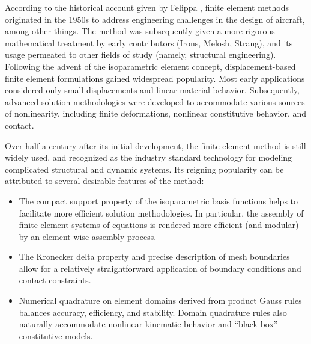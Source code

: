 	According to the historical account given by Felippa \cite{Felippa:04}, finite element methods originated in the 1950s to address engineering challenges in the design of aircraft, among other things. The method was subsequently given a more rigorous mathematical treatment by early contributors (Irons, Melosh, Strang), and its usage permeated to other fields of study (namely, structural engineering). Following the advent of the isoparametric element concept, displacement-based finite element formulations gained widespread popularity. Most early applications considered only small displacements and linear material behavior.
	Subsequently, advanced solution methodologies were developed to accommodate various sources of nonlinearity, including finite deformations, nonlinear constitutive behavior, and contact.

	Over half a century after its initial development, the finite element method is still widely used, and recognized as the industry standard technology for modeling complicated structural and dynamic systems. Its reigning popularity can be attributed to several desirable features of the method:
	\begin{itemize}
		\item The compact support property of the isoparametric basis functions helps to facilitate more efficient solution methodologies. In particular, the assembly of finite element systems of equations is rendered more efficient (and modular) by an element-wise assembly process.
		\item The Kronecker delta property and precise description of mesh boundaries allow for a relatively straightforward application of boundary conditions and contact constraints.
		\item Numerical quadrature on element domains derived from product Gauss rules balances accuracy, efficiency, and stability. Domain quadrature rules also naturally accommodate nonlinear kinematic behavior and ``black box'' constitutive models.
	\end{itemize}	
	
